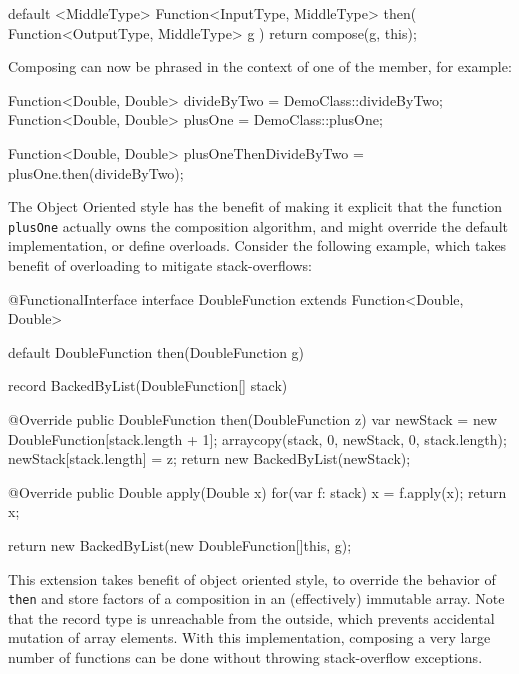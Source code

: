 \documentclass[12pt,a4paper]{report}
\renewcommand{\baselinestretch}{1.5}
\theoremstyle{theorem}
\theoremstyle{definition}
\begin{document}
\renewcommand{\baselinestretch}{1} 
\selectfont
\begin{javacode}
default <MiddleType> Function<InputType, MiddleType> then(
  Function<OutputType, MiddleType> g
)
  { return compose(g, this); }
\end{javacode}

\renewcommand{\baselinestretch}{1.5} 
\selectfont

Composing can now be phrased in the context of one of the member,
for example:

\renewcommand{\baselinestretch}{1} 
\selectfont
\begin{javacode}
Function<Double, Double> divideByTwo = DemoClass::divideByTwo;
Function<Double, Double> plusOne = DemoClass::plusOne;

Function<Double, Double> plusOneThenDivideByTwo
	= plusOne.then(divideByTwo);
\end{javacode}

\renewcommand{\baselinestretch}{1.5} 
\selectfont

The Object Oriented style has the benefit of making it explicit that
the function \lstinline{plusOne}{} actually owns the composition
algorithm, and might override the default implementation,
or define overloads. Consider the following example, which takes benefit
of overloading to mitigate stack-overflows:

\renewcommand{\baselinestretch}{1} 
\selectfont
\begin{javacode}
@FunctionalInterface
interface DoubleFunction extends Function<Double, Double>
{
  
  default DoubleFunction then(DoubleFunction g)
  {
    record BackedByList(DoubleFunction[] stack) {
      @Override
      public DoubleFunction then(DoubleFunction z)
      {
        var newStack = new DoubleFunction[stack.length + 1];
        arraycopy(stack, 0, newStack, 0, stack.length);
        newStack[stack.length] = z;
        return new BackedByList(newStack);
      }
      
      @Override
      public Double apply(Double x)
      {
        for(var f: stack)
          x = f.apply(x);
        return x;
      }
    }
    return new BackedByList(new DoubleFunction[]{this, g});
  }
}
\end{javacode}

\renewcommand{\baselinestretch}{1.5} 
\selectfont

This extension takes benefit of object oriented style, to
override the behavior of \lstinline{then}{} and store factors of a composition
in an (effectively) immutable array. Note that the record type is
unreachable from the outside, which prevents accidental mutation of
array elements. With this implementation, composing a very large number of
functions can be done without throwing stack-overflow exceptions.
\end{document}
